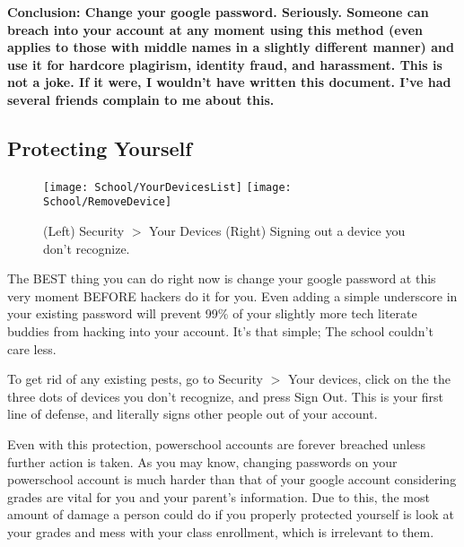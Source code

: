 \textbf{Conclusion: Change your google password. Seriously. Someone can breach into your account at any moment using this method (even applies to those with middle names in a slightly different manner) and use it for hardcore plagirism, identity fraud, and harassment. This is not a joke. If it were, I wouldn't have written this document. I've had several friends complain to me about this.}

\subsection{Protecting Yourself}

\begin{figure}[h]
    \centering
    \texttt{[image: School/YourDevicesList]}
    \texttt{[image: School/RemoveDevice]}
    \caption{
        (Left) Security $>$ Your Devices (Right) Signing out a device you don't recognize.
    }
\end{figure}

The BEST thing you can do right now is change your google password at this very moment BEFORE hackers do it for you. Even adding a simple underscore in your existing password will prevent 99\% of your slightly more tech literate buddies from hacking into your account. It's that simple; The school couldn't care less.

To get rid of any existing pests, go to Security $>$ Your devices, click on the the three dots of devices you don't recognize, and press Sign Out. This is your first line of defense, and literally signs other people out of your account.

Even with this protection, powerschool accounts are forever breached unless further action is taken. As you may know, changing passwords on your powerschool account is much harder than that of your google account considering grades are vital for you and your parent's information. Due to this, the most amount of damage a person could do if you properly protected yourself is look at your grades and mess with your class enrollment, which is irrelevant to them.

